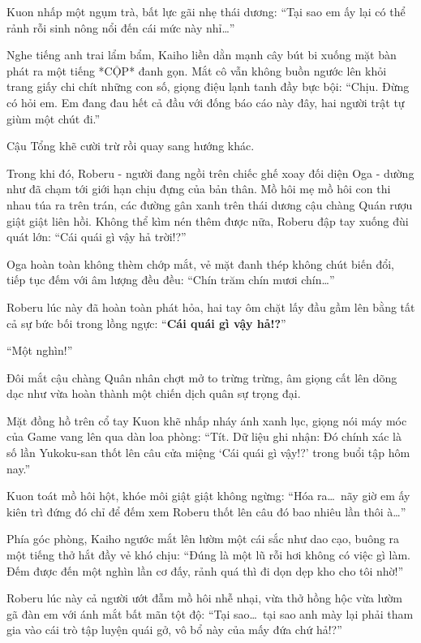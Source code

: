 \documentclass[../main.tex]{subfiles}
\begin{document}
Kuon nhấp một ngụm trà, bất lực gãi nhẹ thái dương: ``Tại sao em ấy lại có thể rảnh rỗi sinh nông nổi đến cái mức này nhỉ\dots''

Nghe tiếng anh trai lẩm bẩm, Kaiho liền dằn mạnh cây bút bi xuống mặt bàn phát ra một tiếng *CỘP* đanh gọn. Mắt cô vẫn không buồn ngước lên khỏi trang giấy chi chít những con số, giọng điệu lạnh tanh đầy bực bội: ``Chịu. Đừng có hỏi em. Em đang đau hết cả đầu với đống báo cáo này đây, hai người trật tự giùm một chút đi.''

Cậu Tổng khẽ cười trừ rồi quay sang hướng khác.

Trong khi đó, Roberu - người đang ngồi trên chiếc ghế xoay đối diện Oga - dường như đã chạm tới giới hạn chịu đựng của bản thân. Mồ hôi mẹ mồ hôi con thi nhau túa ra trên trán, các đường gân xanh trên thái dương cậu chàng Quán rượu giật giật liên hồi. Không thể kìm nén thêm được nữa, Roberu đập tay xuống đùi quát lớn: ``Cái quái gì vậy hả trời!?''


Oga hoàn toàn không thèm chớp mắt, vẻ mặt đanh thép không chút biến đổi, tiếp tục đếm với âm lượng đều đều: ``Chín trăm chín mươi chín\dots''

Roberu lúc này đã hoàn toàn phát hỏa, hai tay ôm chặt lấy đầu gầm lên bằng tất cả sự bức bối trong lồng ngực: ``\textbf{Cái quái gì vậy hả!?}''

``Một nghìn!''

Đôi mắt cậu chàng Quân nhân chợt mở to trừng trừng, âm giọng cất lên dõng dạc như vừa hoàn thành một chiến dịch quân sự trọng đại.

Mặt đồng hồ trên cổ tay Kuon khẽ nhấp nháy ánh xanh lục, giọng nói máy móc của Game vang lên qua dàn loa phòng: ``Tít. Dữ liệu ghi nhận: Đó chính xác là số lần Yukoku-san thốt lên câu cửa miệng `Cái quái gì vậy!?' trong buổi tập hôm nay.''

Kuon toát mồ hôi hột, khóe môi giật giật không ngừng: ``Hóa ra\dots\ nãy giờ em ấy kiên trì đứng đó chỉ để đếm xem Roberu thốt lên câu đó bao nhiêu lần thôi à\dots''

Phía góc phòng, Kaiho ngước mắt lên lườm một cái sắc như dao cạo, buông ra một tiếng thở hắt đầy vẻ khó chịu: ``Đúng là một lũ rỗi hơi không có việc gì làm. Đếm được đến một nghìn lần cơ đấy, rảnh quá thì đi dọn dẹp kho cho tôi nhờ!''

Roberu lúc này cả người ướt đẫm mồ hôi nhễ nhại, vừa thở hồng hộc vừa lườm gã đàn em với ánh mắt bất mãn tột độ: ``Tại sao\dots\ tại sao anh mày lại phải tham gia vào cái trò tập luyện quái gở, vô bổ này của mấy đứa chứ hả!?''
\end{document}
